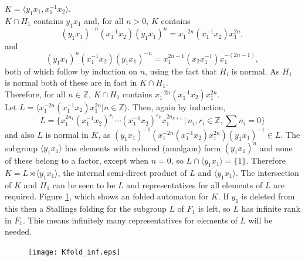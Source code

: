 \documentclass[a4paper,12pt]{article}
\numberwithin{equation}{section}
\numberwithin{figure}{section}
\newcommand{\ZZ}{\ensuremath{\mathbb{Z}}}
\newcommand{\la}{\langle}
\newcommand{\ra}{\rangle}
\begin{document}
\par\noindent $K=\la y_1x_1,x_1^{-1}x_2\ra$. \\[1em]
$K\cap H_1$ contains $y_1x_1$ and, for all $n>0$, $K$ contains
\[(y_1x_1)^{-n}(x_1^{-1}x_2)(y_1x_1)^{n}=x_1^{-2n}(x_1^{-1}x_2) x_1^{2n},\]
and 
\[(y_1x_1)^{n}(x_1^{-1}x_2)(y_1x_1)^{-n}=x_1^{2n-1}(x_2x_1^{-1}) x_1^{-(2n-1)},\]
both of which follow by induction on $n$, using the fact that $H_i$ is normal. 
As $H_1$ is normal both of these are in fact in $K\cap H_1$. \\[1em]
Therefore, for all $n\in \ZZ$, $K\cap H_1$ contains $x_1^{-2n}(x_1^{-1}x_2) x_1^{2n}$. \\[1em]
Let $L=\la x_1^{-2n}(x_1^{-1}x_2) x_1^{2n}|n\in \ZZ\ra$. Then, again by induction, 
\[L=\{x_1^{2n_1}(x_1^{-1}x_2)^{r_1}\cdots (x_1^{-1}x_2)^{r_k}x_1^{2n_{k+1}}\,|\,n_i,r_i\in\ZZ, \sum n_i=0\}\]
and also $L$ is normal in $K$, as $(y_1x_1)^{-1}(x_1^{-2n}(x_1^{-1}x_2) x_1^{2n})(y_1x_1)^{-1}\in L$.  
The subgroup $\la y_1x_1\ra$ has elements with reduced (amalgam) form $(y_1x_1)^n$ and none 
of these belong to a factor, except when $n=0$, so $L\cap \la y_1x_1\ra=\{1\}$.
 Therefore
$K=L\rtimes \la y_1x_1\ra$, the internal semi-direct product of $L$ and $\la y_1x_1\ra$.
The intersection of $K$ and $H_1$ can be seen to be $L$ and  representatives for all 
elements of $L$ are required. 
Figure \ref{fig:Kfold_inf}, which shows an folded automaton for $K$. If $y_1$ is deleted from
this then a  Stallings folding for the subgroup $L$ of $F_1$ is left, so $L$ has infinite
rank in $F_1$. This means infinitely many representatives for elements of $L$ will 
be needed. 
\begin{figure}
\begin{center}
\texttt{[image: Kfold\_inf.eps]}
\caption{}\label{fig:Kfold_inf}
\end{center}
\end{figure}
%
%
\end{document}
